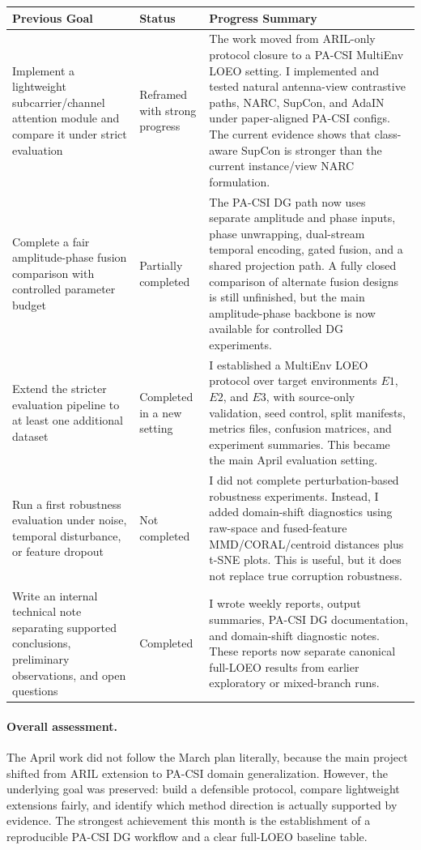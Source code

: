 \documentclass[11pt]{article}
\begin{document}
\begin{longtable}{@{}p{1.55in}p{1.0in}p{3.55in}@{}}
\toprule
Previous Goal & Status & Progress Summary \\
\midrule
\endhead
Implement a lightweight subcarrier/channel attention module and compare it under strict evaluation & Reframed with strong progress & The work moved from ARIL-only protocol closure to a PA-CSI MultiEnv LOEO setting. I implemented and tested natural antenna-view contrastive paths, NARC, SupCon, and AdaIN under paper-aligned PA-CSI configs. The current evidence shows that class-aware SupCon is stronger than the current instance/view NARC formulation. \\
\addlinespace
Complete a fair amplitude-phase fusion comparison with controlled parameter budget & Partially completed & The PA-CSI DG path now uses separate amplitude and phase inputs, phase unwrapping, dual-stream temporal encoding, gated fusion, and a shared projection path. A fully closed comparison of alternate fusion designs is still unfinished, but the main amplitude-phase backbone is now available for controlled DG experiments. \\
\addlinespace
Extend the stricter evaluation pipeline to at least one additional dataset & Completed in a new setting & I established a MultiEnv LOEO protocol over target environments $E1$, $E2$, and $E3$, with source-only validation, seed control, split manifests, metrics files, confusion matrices, and experiment summaries. This became the main April evaluation setting. \\
\addlinespace
Run a first robustness evaluation under noise, temporal disturbance, or feature dropout & Not completed & I did not complete perturbation-based robustness experiments. Instead, I added domain-shift diagnostics using raw-space and fused-feature MMD/CORAL/centroid distances plus t-SNE plots. This is useful, but it does not replace true corruption robustness. \\
\addlinespace
Write an internal technical note separating supported conclusions, preliminary observations, and open questions & Completed & I wrote weekly reports, output summaries, PA-CSI DG documentation, and domain-shift diagnostic notes. These reports now separate canonical full-LOEO results from earlier exploratory or mixed-branch runs. \\
\bottomrule
\end{longtable}

\paragraph{Overall assessment.}
The April work did not follow the March plan literally, because the main project shifted from ARIL extension to PA-CSI domain generalization. However, the underlying goal was preserved: build a defensible protocol, compare lightweight extensions fairly, and identify which method direction is actually supported by evidence. The strongest achievement this month is the establishment of a reproducible PA-CSI DG workflow and a clear full-LOEO baseline table.
\end{document}
